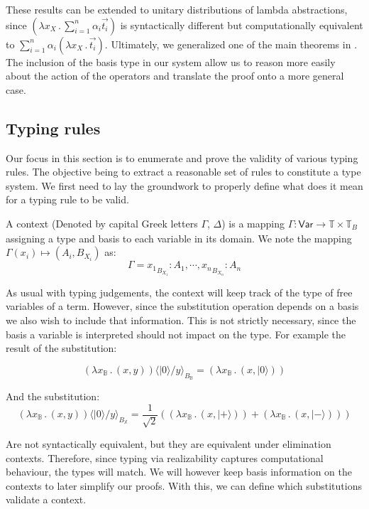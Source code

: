 \documentclass[runningheads,orivec]{llncs}
\newcommand\ket[1]{\ensuremath{|#1\rangle}}
\newcommand\Var{\ensuremath{\mathsf{Var}}}
\newcommand\ansubst[2]{\ensuremath{\langle #1 \rangle_{#2}}}
\def\Pair#1#2{(#1,#2)} %
\def\Lam#1#2#3{\lambda#1_{#2}\,{.}\,#3} %
\def\Type{\mathbb{T}}
\def\BasisType{\Type_{\basis{}}}
\newcommand\B{\mathbb B}
\newcommand\XB{\mathbb X}
\newcommand\basis[1]{\ensuremath{B_{ #1 }}}
\begin{document}
These results can be extended to unitary distributions of lambda abstractions, since $(\Lam{x}{X}{\sum_{i=1}^{n}\alpha_i \vec{t_i}})$ is syntactically different but computationally equivalent to $\sum_{i=1}^{n}\alpha_i (\Lam{x}{X}{\vec{t_i}})$. Ultimately, we generalized one of the main theorems in \cite{DiazcaroGuillermoMiquelValironLICS19}. The inclusion of the basis type in our system allow us to reason more easily about the action of the operators and translate the proof onto a more general case. 


\subsection{Typing rules}    
Our focus in this section is to enumerate and prove the validity of various typing rules. The objective being to extract a reasonable set of rules to constitute a type system. We first need to lay the groundwork to properly define what does it mean for a typing rule to be valid.

\begin{definition}
    A context (Denoted by capital Greek letters $\Gamma$, $\Delta$) is a mapping $\Gamma:\Var\to\Type\times\BasisType$ assigning a type and basis to each variable in its domain. We note the mapping $\Gamma(x_i)\mapsto(A_i, \basis{X_i})$ as:
    \[
    \Gamma = {x_1}_{\basis{X_1}}:A_1,\dotsb, {x_n}_{\basis{X_n}}:A_n
    \]
\end{definition}

As usual with typing judgements, the context will keep track of the type of free variables of a term. However, since the substitution operation depends on a basis we also wish to include that information. This is not strictly necessary, since the basis a variable is interpreted should not impact on the type. For example the result of the substitution:

\[
(\Lam{x}{\B}{\Pair{x}{y}})\ansubst{\ket{0}/y}{\basis{\B}} = (\Lam{x}{\B}{\Pair{x}{\ket{0}}})
\]

And the substitution:
\[
(\Lam{x}{\B}{(x, y)})\ansubst{\ket{0}/y}{\basis{\XB}} = \frac{1}{\sqrt{2}} ((\Lam{x}{\B}{\Pair{x}{\ket{+}}}) + (\Lam{x}{\B}{\Pair{x}{\ket{-}}}))
\]

Are not syntactically equivalent, but they are equivalent under elimination contexts. Therefore, since typing via realizability captures computational behaviour, the types will match. We will however keep basis information on the contexts to later simplify our proofs. With this, we can define which substitutions validate a context.
\end{document}
